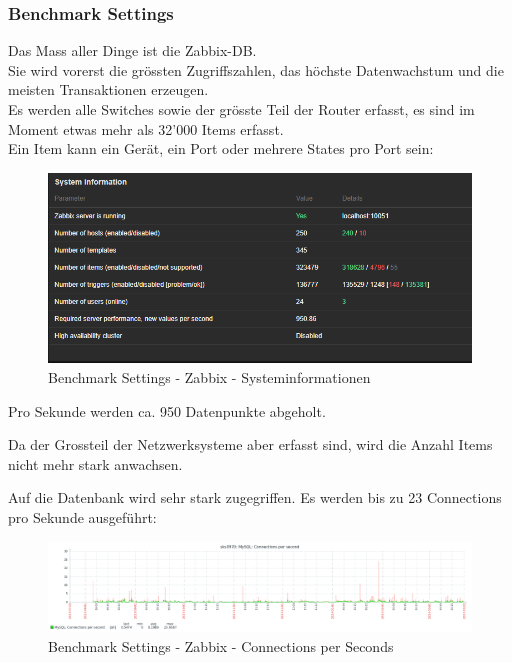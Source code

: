 
\begin{flushleft}
    \subsubsection{Benchmark Settings}
    \label{subsubsec:benchmark_settings}
    Das Mass aller Dinge ist die Zabbix-DB.\\
    Sie wird vorerst die grössten Zugriffszahlen, das höchste Datenwachstum und die meisten Transaktionen erzeugen.\\
    Es werden alle Switches sowie der grösste Teil der Router erfasst, es sind im Moment etwas mehr als 32'000 Items erfasst.\\
    Ein Item kann ein Gerät, ein Port oder mehrere States pro Port sein:
    \begin{figure}[H]
        \centering
        \includegraphics[width=0.8\linewidth]{source/implementation/evaluation/benchmarking/sks0970_zabbix_system_information}
        \caption{Benchmark Settings - Zabbix - Systeminformationen}
        \label{fig:sks0970_zabbix_system_information}
    \end{figure}
    Pro Sekunde werden ca.
    950 Datenpunkte abgeholt.
\end{flushleft}
\begin{flushleft}
    Da der Grossteil der Netzwerksysteme aber erfasst sind, wird die Anzahl Items nicht mehr stark anwachsen.
\end{flushleft}
\begin{flushleft}
    Auf die Datenbank wird sehr stark zugegriffen.
    Es werden bis zu 23 Connections pro Sekunde ausgeführt:
    \begin{figure}[H]
        \centering
        \includegraphics[width=0.8\linewidth]{source/implementation/evaluation/benchmarking/sks0970_zabbix_mariadb_connections_per_second_graph}
        \caption{Benchmark Settings - Zabbix - Connections per Seconds}
        \label{fig:sks0970_zabbix_mariadb_connections_per_second_graph}
    \end{figure}
\end{flushleft}
